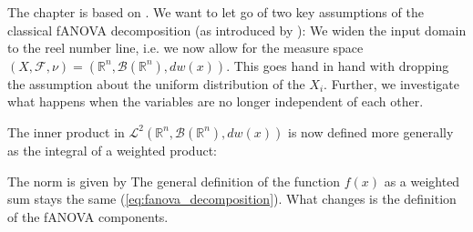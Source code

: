 The chapter is based on \cite{hooker2007}. We want to let go of two key assumptions of the classical fANOVA decomposition (as introduced by \cite{sobol1993sensitivity}): We widen the input domain to the reel number line, i.e. we now allow for the measure space $(X, \mathcal{F}, \nu) = (\mathbb{R}^n, \mathcal{B}(\mathbb{R}^n), dw(x))$. This goes hand in hand with dropping the assumption about the uniform distribution of the $X_i$. Further, we investigate what happens when the variables are no longer independent of each other.\par
The inner product in $\mathcal{L}^2(\mathbb{R}^n, \mathcal{B}(\mathbb{R}^n), dw(x))$ is now defined more generally as the integral of a weighted product:
\[

\]

The norm is given by 
The general definition of the function $f(x)$ as a weighted sum stays the same (\autoref{eq:fanova_decomposition}). What changes is the definition of the fANOVA components.




